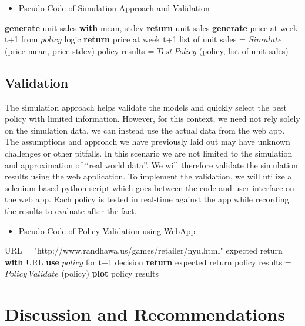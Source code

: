 \documentclass[11pt,a4paper]{article}
\begin{document}
\begin{itemize}[leftmargin=*]
    \item Pseudo Code of Simulation Approach and Validation
\end{itemize}

\begin{algorithmic}[1]
            \State \textbf{generate} unit sales \textbf{with} mean, stdev
        \EndFor
        \State \textbf{return} unit sales
    \EndProcedure
    \State 
            \State \textbf{generate} price at week t+1 from $policy$ logic
        \EndFor
        \State \textbf{return} price at week t+1
    \EndProcedure
    \State
            \State list of unit sales = $Simulate$ (price mean, price stdev) 
            \State policy results = $Test\ Policy$ (policy, list of unit sales) 
        \EndFor
    \EndFor
\end{algorithmic}

\subsection{Validation}
The simulation approach helps validate the models and quickly select the best policy with limited information. 
However, for this context, we need not rely solely on the simulation data, we can instead use the actual data from the web app. 
The assumptions and approach we have previously laid out may have unknown challenges or other pitfalls. 
In this scenario we are not limited to the simulation and approximation of “real world data”. 
We will therefore validate the simulation results using the web application. 
To implement the validation, we will utilize a selenium-based python script which goes between the code and user interface on the web app. 
Each policy is tested in real-time against the app while recording the results to evaluate after the fact. \\

\begin{itemize}[leftmargin=*]
    \item Pseudo Code of Policy Validation using WebApp
\end{itemize}

\begin{algorithmic}[1]
        \State URL = "http://www.randhawa.us/games/retailer/nyu.html"
        \State expected return = \textbf{with} URL \textbf{use} $policy$ for t+1 decision
        \State \textbf{return} expected return
    \EndProcedure
    \State
            \State policy results = $Policy\ Validate$ (policy) 
        \EndFor
    \EndFor
    \State \textbf{plot} policy results
\end{algorithmic}
\pagebreak

\section{Discussion and Recommendations}

\pagebreak


\end{document}
